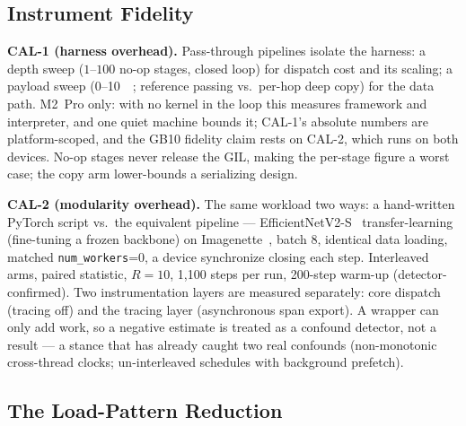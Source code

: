 \subsection{Instrument Fidelity}
\label{sec:setup-fidelity}

\textbf{CAL-1 (harness overhead).} Pass-through pipelines isolate the harness:
a depth sweep ($1$--$100$ no-op stages, closed loop) for dispatch cost and
its scaling; a payload sweep (\SI{0}{}--\SI{10}{\mebi\byte}; reference
passing vs.\ per-hop deep copy) for the data path. M2~Pro only: with no
kernel in the loop this measures framework and interpreter, and one quiet
machine bounds it; CAL-1's absolute numbers are platform-scoped, and the GB10
fidelity claim rests on CAL-2, which runs on both devices. No-op stages never
release the GIL, making the per-stage figure a worst case; the copy arm
lower-bounds a serializing design.

\textbf{CAL-2 (modularity overhead).} The same workload two ways: a
hand-written PyTorch script vs.\ the equivalent \sysname{} pipeline ---
EfficientNetV2-S~\cite{tan2021efficientnetv2} transfer-learning
(fine-tuning a frozen backbone) on Imagenette~\cite{imagenette}, batch 8,
identical data loading, matched \texttt{num\_workers}=0, a device
synchronize closing each step. Interleaved arms, paired statistic,
$R{=}10$, 1{,}100 steps per run, 200-step warm-up (detector-confirmed).
Two instrumentation layers are measured separately: core dispatch (tracing
off) and the tracing layer (asynchronous span export). A wrapper can only
add work, so a negative estimate is treated as a confound detector, not a
result --- a stance that has already caught two real confounds
(non-monotonic cross-thread clocks; un-interleaved schedules with
background prefetch).

\subsection{The Load-Pattern Reduction}
\label{sec:setup-reduction}

